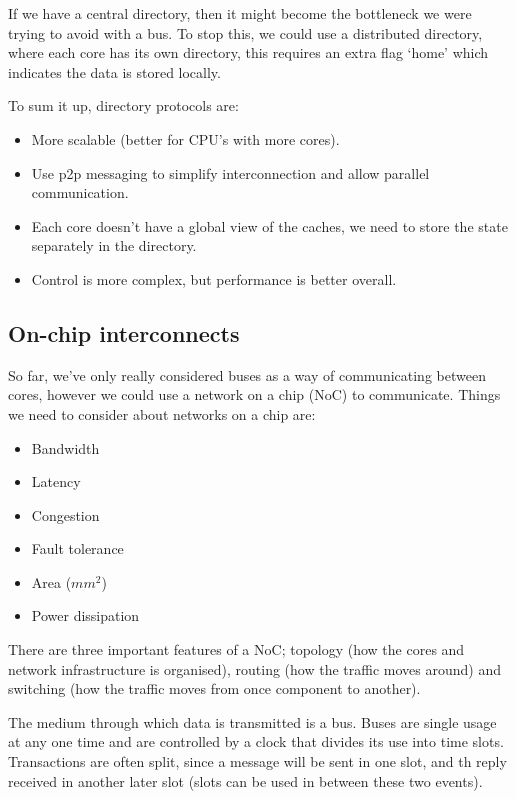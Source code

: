 If we have a central directory, then it might become the bottleneck we were
trying to avoid with a bus. To stop this, we could use a distributed directory,
where each core has its own directory, this requires an extra flag `home' which
indicates the data is stored locally.

To sum it up, directory protocols are:

\begin{itemize}
  \item More scalable (better for CPU's with more cores).
  \item Use p2p messaging to simplify interconnection and allow parallel
    communication.
  \item Each core doesn't have a global view of the caches, we need to store the
    state separately in the directory.
  \item Control is more complex, but performance is better overall.
\end{itemize} 

\subsection{On-chip interconnects}

So far, we've only really considered buses as a way of communicating between
cores, however we could use a network on a chip (NoC) to communicate. Things we
need to consider about networks on a chip are:

\begin{mymulticols}
  \begin{itemize}
    \item Bandwidth
    \item Latency
    \item Congestion
    \item Fault tolerance
    \item Area ($mm^2$)
    \item Power dissipation
  \end{itemize}
\end{mymulticols}

There are three important features of a NoC; topology (how the cores and network
infrastructure is organised), routing (how the traffic moves around) and
switching (how the traffic moves from once component to another).

The medium through which data is transmitted is a bus. Buses are single usage at
any one time and are controlled by a clock that divides its use into time slots.
Transactions are often split, since a message will be sent in one slot, and th
reply received in another later slot (slots can be used in between these two
events).


